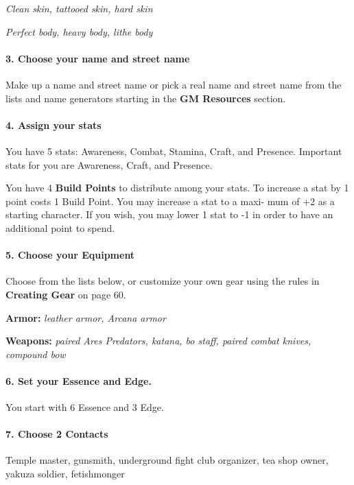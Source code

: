 \begin{multicols}{3}
\textit{Clean skin, tattooed skin, hard skin}

\textit{Perfect body, heavy body, lithe body}

\paragraph{3.  Choose your name and street name}

Make up a name and street name or pick a real
name and street name from the lists and name
generators starting in the \textbf{GM Resources} section.

\paragraph{4.  Assign your stats}

You have 5 stats: Awareness, Combat, Stamina,
Craft, and Presence. Important stats for you are
Awareness, Craft, and Presence.

You have 4 \textbf{Build Points} to distribute among
your stats. To increase a stat by 1 point costs 1
Build Point. You may increase a stat to a maxi-
mum of +2 as a starting character. If you wish,
you may lower 1 stat to -1 in order to have an
additional point to spend.

\paragraph{5.  Choose your Equipment}

Choose from the lists below, or customize your
own gear using the rules in \textbf{Creating Gear} on
page 60.

\textbf{Armor:} \textit{leather armor, Arcana armor}

\textbf{Weapons:} \textit{paired Ares Predators, katana, bo
staff, paired combat knives, compound bow}

\paragraph{6.  Set your Essence and Edge.}

You start with 6 Essence and 3 Edge.

\paragraph{7.  Choose 2 Contacts}

Temple master, gunsmith, underground fight
club organizer, tea shop owner, yakuza soldier,
fetishmonger


\end{multicols}
